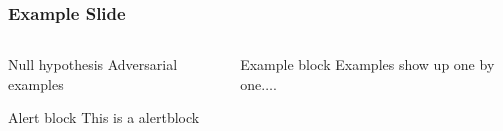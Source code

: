 \documentclass[10pt,usepdftitle=false,aspectratio=169]{beamer}
\begin{document}
\begin{frame}[fragile]
	\frametitle{Example Slide}
	\begin{columns}
		\begin{column}{.5\columnwidth}
			\begin{block}{Null hypothesis}
				Adversarial examples
			\end{block}
			\begin{alertblock}{Alert block}
				This is a alertblock
			\end{alertblock}
		\end{column}
		\begin{column}{.5\columnwidth}
			\begin{exampleblock}{Example block}
				Examples show up one by one$\dots$.
				\begin{itemize}
				\end{itemize}
			\end{exampleblock}
		\end{column}
	\end{columns}
\end{frame}
\end{document}
